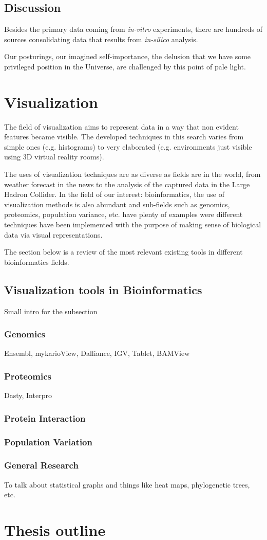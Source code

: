 \subsection{Discussion}
Besides the primary data coming from \emph{in-vitro} experiments, there are hundreds of sources consolidating data that results from \emph{in-silico} analysis.

\begin{savequote}[75mm] 
Our posturings, our imagined self-importance, the delusion that we have some privileged position in the Universe, are challenged by this point of pale light.
\end{savequote}
\section{Visualization}
The field of visualization aims to represent data in a way that non evident features became visible. The developed techniques in this search varies from simple ones (e.g. histograms) to very elaborated (e.g. environments just visible using 3D virtual reality rooms).

The uses of visualization techniques are as diverse as fields are in the world, from weather forecast in the news to the analysis of the captured data in the Large Hadron Collider. In the field of our interest: bioinformatics, the use of visualization methods is also abundant and sub-fields such as genomics, proteomics, population variance, etc. have plenty of examples were different techniques have been implemented with the purpose of making sense of biological data via visual representations.

The section below is a review of the most relevant existing tools in different bioinformatics fields.
\subsection{Visualization tools in Bioinformatics}
Small intro for the subsection
\subsubsection{Genomics}
Ensembl, mykarioView, Dalliance, IGV, Tablet, BAMView
\subsubsection{Proteomics}
Dasty, Interpro
\subsubsection{Protein Interaction}
\subsubsection{Population Variation}
\subsubsection{General Research}
To talk about statistical graphs and things like heat maps, phylogenetic trees, etc.


\section{Thesis outline}
